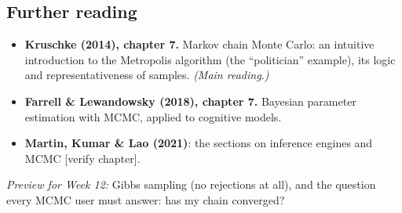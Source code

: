 \subsection{Further reading}

\begin{itemize}
\tightlist
\item
  \textbf{Kruschke (2014), chapter 7.} Markov chain Monte Carlo: an
  intuitive introduction to the Metropolis algorithm (the ``politician''
  example), its logic and representativeness of samples. \emph{(Main
  reading.)}
\item
  \textbf{Farrell \& Lewandowsky (2018), chapter 7.} Bayesian parameter
  estimation with MCMC, applied to cognitive models.
\item
  \textbf{Martin, Kumar \& Lao (2021)}: the sections on inference
  engines and MCMC {[}verify chapter{]}.
\end{itemize}

\emph{Preview for Week 12:} Gibbs sampling (no rejections at all), and
the question every MCMC user must answer: has my chain converged?
